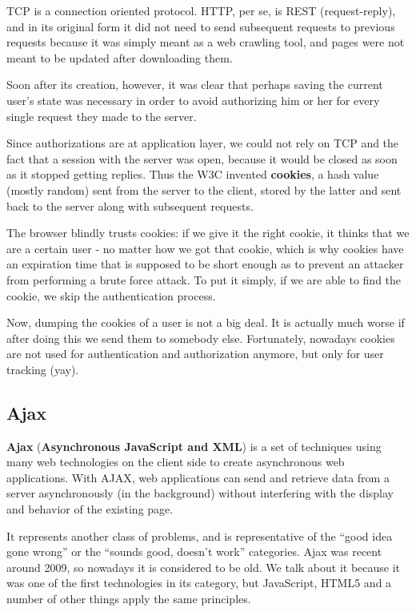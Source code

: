 TCP is a connection oriented protocol. HTTP, per se, is REST (request-reply), and in its original form it did not need to send subsequent requests to previous requests because it was simply meant as a web crawling tool, and pages were not meant to be updated after downloading them.

Soon after its creation, however, it was clear that perhaps saving the current user’s state was necessary in order to avoid authorizing him or her for every single request they made to the server.

Since authorizations are at application layer, we could not rely on TCP and the fact that a session with the server was open, because it would be closed as soon as it stopped getting replies. Thus the W3C invented \textbf{cookies}, a hash value (mostly random) sent from the server to the client, stored by the latter and sent back to the server along with subsequent requests.

The browser blindly trusts cookies: if we give it the right cookie, it thinks that we are a certain user - no matter how we got that cookie, which is why cookies have an expiration time that is supposed to be short enough as to prevent an attacker from performing a brute force attack. To put it simply, if we are able to find the cookie, we skip the authentication process.

Now, dumping the cookies of a user is not a big deal. It is actually much worse if after doing this we send them to somebody else. Fortunately, nowadays cookies are not used for authentication and authorization anymore, but only for user tracking (yay).

\subsection{Ajax}
\textbf{Ajax} (\textbf{Asynchronous JavaScript and XML}) is a set of techniques using many web technologies on the client side to create asynchronous web applications. With AJAX, web applications can send and retrieve data from a server asynchronously (in the background) without interfering with the display and behavior of the existing page.
 
It represents another class of problems, and is representative of the “good idea gone wrong” or the “sounds good, doesn't work” categories. Ajax was recent around 2009, so nowadays it is considered to be old. We talk about it because it was one of the first technologies in its category, but JavaScript, HTML5 and a number of other things apply the same principles.

